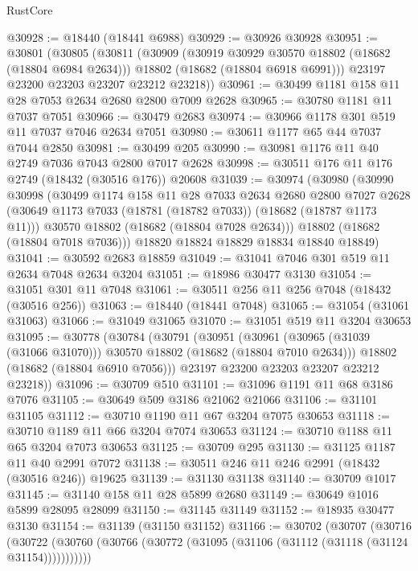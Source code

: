 \begin{lexlean}{RustCore}
\begin{coremodule}
@30928 := @18440 (@18441 @6988)
@30929 := @30926 @30928
@30951 := @30801
    (@30805
      (@30811
        (@30909
          (@30919 @30929 @30570 @18802 (@18682 (@18804 @6984 @2634)))
          @18802
          (@18682 (@18804 @6918 @6991)))
        @23197
        @23200
        @23203
        @23207
        @23212
        @23218))
@30961 := @30499 @1181 @158 @11 @28 @7053 @2634 @2680 @2800 @7009 @2628
@30965 := @30780 @1181 @11 @7037 @7051
@30966 := @30479 @2683
@30974 := @30966 @1178 @301 @519 @11 @7037 @7046 @2634 @7051
@30980 := @30611 @1177 @65 @44 @7037 @7044 @2850
@30981 := @30499 @205
@30990 := @30981 @1176 @11 @40 @2749 @7036 @7043 @2800 @7017 @2628
@30998 := @30511 @176 @11 @176 @2749 (@18432 (@30516 @176)) @20608
@31039 := @30974
    (@30980
      (@30990
        @30998
        (@30499
          @1174
          @158
          @11
          @28
          @7033
          @2634
          @2680
          @2800
          @7027
          @2628
          (@30649 @1173 @7033 (@18781 (@18782 @7033)) (@18682 (@18787 @1173 @11)))
          @30570
          @18802
          (@18682 (@18804 @7028 @2634)))
        @18802
        (@18682 (@18804 @7018 @7036)))
      @18820
      @18824
      @18829
      @18834
      @18840
      @18849)
@31041 := @30592 @2683 @18859
@31049 := @31041 @7046 @301 @519 @11 @2634 @7048 @2634 @3204
@31051 := @18986 @30477 @3130
@31054 := @31051 @301 @11 @7048
@31061 := @30511 @256 @11 @256 @7048 (@18432 (@30516 @256))
@31063 := @18440 (@18441 @7048)
@31065 := @31054 (@31061 @31063)
@31066 := @31049 @31065
@31070 := @31051 @519 @11 @3204 @30653
@31095 := @30778
    (@30784
      (@30791
        (@30951
          (@30961 (@30965 (@31039 (@31066 @31070))) @30570 @18802 (@18682 (@18804 @7010 @2634)))
          @18802
          (@18682 (@18804 @6910 @7056)))
        @23197
        @23200
        @23203
        @23207
        @23212
        @23218))
@31096 := @30709 @510
@31101 := @31096 @1191 @11 @68 @3186 @7076
@31105 := @30649 @509 @3186 @21062 @21066
@31106 := @31101 @31105
@31112 := @30710 @1190 @11 @67 @3204 @7075 @30653
@31118 := @30710 @1189 @11 @66 @3204 @7074 @30653
@31124 := @30710 @1188 @11 @65 @3204 @7073 @30653
@31125 := @30709 @295
@31130 := @31125 @1187 @11 @40 @2991 @7072
@31138 := @30511 @246 @11 @246 @2991 (@18432 (@30516 @246)) @19625
@31139 := @31130 @31138
@31140 := @30709 @1017
@31145 := @31140 @158 @11 @28 @5899 @2680
@31149 := @30649 @1016 @5899 @28095 @28099
@31150 := @31145 @31149
@31152 := @18935 @30477 @3130
@31154 := @31139 (@31150 @31152)
@31166 := @30702
    (@30707
      (@30716
        (@30722 (@30760 (@30766 (@30772 (@31095 (@31106 (@31112 (@31118 (@31124 @31154)))))))))))

\end{coremodule}
\end{lexlean}
